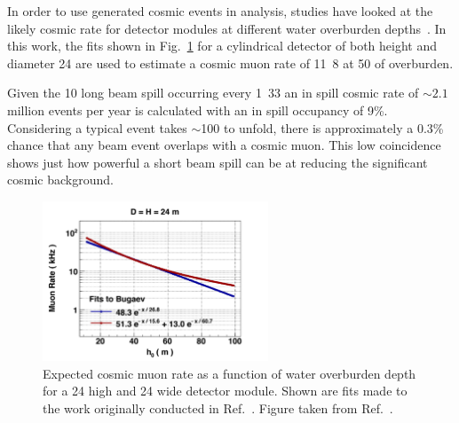 In order to use generated cosmic events in analysis, studies have looked at the likely cosmic rate
for \chips detector modules at different water overburden depths~\cite{son2013}. In this work, the
fits shown in Fig.~\ref{fig:cosmic_rate} for a cylindrical detector of both height and diameter
\unit{24}{} are used to estimate a \chipsfive cosmic muon rate of
\unit{11.8}{} at \unit{50}{} of overburden.

Given the \unit{10}{\mu{}} long \numi beam spill occurring every \unit{1.33}{}
an in spill cosmic rate of $\sim2.1$ million events per year is calculated with an in spill
occupancy of 9\%. Considering a typical event takes $\sim$\unit{100}{} to unfold, there
is approximately a 0.3\% chance that any beam event overlaps with a cosmic muon. This low
coincidence shows just how powerful a short beam spill can be at reducing the significant cosmic
background.

\begin{figure} %
    \includegraphics[width=0.6\textwidth]{diagrams/4-chips/cosmic_rate.pdf}
    \caption[Expected \chipsfive cosmic muon rate as a function of water overburden depth]
    {Expected cosmic muon rate as a function of water overburden depth for a \unit{24}{}
        high and \unit{24}{} wide \chips detector module. Shown are fits made to the
        work originally conducted in Ref.~\cite{bugaev1998}. Figure taken from
        Ref.~\cite{son2013}.}
    \label{fig:cosmic_rate}
\end{figure}